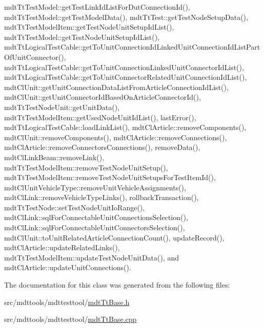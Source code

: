 mdt\-Tt\-Test\-Model\-::get\-Test\-Link\-Id\-List\-For\-Dut\-Connection\-Id(), mdt\-Tt\-Test\-Model\-::get\-Test\-Model\-Data(), mdt\-Tt\-Test\-::get\-Test\-Node\-Setup\-Data(), mdt\-Tt\-Test\-Model\-Item\-::get\-Test\-Node\-Unit\-Setup\-Id\-List(), mdt\-Tt\-Test\-Model\-::get\-Test\-Node\-Unit\-Setup\-Id\-List(), mdt\-Tt\-Logical\-Test\-Cable\-::get\-To\-Unit\-Connection\-Id\-Linked\-Unit\-Connection\-Id\-List\-Part\-Of\-Unit\-Connector(), mdt\-Tt\-Logical\-Test\-Cable\-::get\-To\-Unit\-Connection\-Linked\-Unit\-Connector\-Id\-List(), mdt\-Tt\-Logical\-Test\-Cable\-::get\-To\-Unit\-Connector\-Related\-Unit\-Connection\-Id\-List(), mdt\-Cl\-Unit\-::get\-Unit\-Connection\-Data\-List\-From\-Article\-Connection\-Id\-List(), mdt\-Cl\-Unit\-::get\-Unit\-Connector\-Id\-Based\-On\-Article\-Connector\-Id(), mdt\-Tt\-Test\-Node\-Unit\-::get\-Unit\-Data(), mdt\-Tt\-Test\-Model\-Item\-::get\-Used\-Node\-Unit\-Id\-List(), last\-Error(), mdt\-Tt\-Logical\-Test\-Cable\-::load\-Link\-List(), mdt\-Cl\-Article\-::remove\-Components(), mdt\-Cl\-Unit\-::remove\-Components(), mdt\-Cl\-Article\-::remove\-Connections(), mdt\-Cl\-Article\-::remove\-Connectors\-Connections(), remove\-Data(), mdt\-Cl\-Link\-Beam\-::remove\-Link(), mdt\-Tt\-Test\-Model\-Item\-::remove\-Test\-Node\-Unit\-Setup(), mdt\-Tt\-Test\-Model\-Item\-::remove\-Test\-Node\-Unit\-Setups\-For\-Test\-Item\-Id(), mdt\-Cl\-Unit\-Vehicle\-Type\-::remove\-Unit\-Vehicle\-Assignments(), mdt\-Cl\-Link\-::remove\-Vehicle\-Type\-Links(), rollback\-Transaction(), mdt\-Tt\-Test\-Node\-::set\-Test\-Node\-Unit\-Io\-Range(), mdt\-Cl\-Link\-::sql\-For\-Connectable\-Unit\-Connections\-Selection(), mdt\-Cl\-Link\-::sql\-For\-Connectable\-Unit\-Connectors\-Selection(), mdt\-Cl\-Unit\-::to\-Unit\-Related\-Article\-Connection\-Count(), update\-Record(), mdt\-Cl\-Article\-::update\-Related\-Links(), mdt\-Tt\-Test\-Model\-Item\-::update\-Test\-Node\-Unit\-Data(), and mdt\-Cl\-Article\-::update\-Unit\-Connections().



The documentation for this class was generated from the following files\-:\begin{DoxyCompactItemize}
\item 
src/mdttools/mdttesttool/\hyperlink{mdt_tt_base_8h}{mdt\-Tt\-Base.\-h}\item 
src/mdttools/mdttesttool/\hyperlink{mdt_tt_base_8cpp}{mdt\-Tt\-Base.\-cpp}\end{DoxyCompactItemize}
